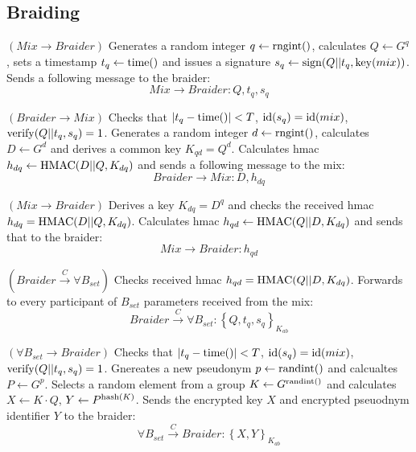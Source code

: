 \documentclass[12pt]{article}
\begin{document}
\subsection*{Braiding}

\begin{steps}
\item $(Mix \to Braider)$ Generates a random integer $q \leftarrow {\rm rngint}()$, calculates $Q \leftarrow G^q$, sets a timestamp $t_q \leftarrow {\rm time}()$ and issues a signature $s_q \leftarrow {\rm sign}(Q||t_q, {\rm key}(mix))$. Sends a following message to the braider:
  \begin{equation}
    Mix \to Braider: Q, t_q, s_q
  \end{equation}
\item $(Braider \to Mix)$ Checks that $|t_q - {\rm time}()|<T$, ${\rm id}(s_q)={\rm id}(mix)$, ${\rm verify}(Q||t_q, s_q) = 1$. Generates a random integer $d \leftarrow {\rm rngint}()$, calculates $D \leftarrow G^d$ and derives a common key $K_{qd} = Q^d$. Calculates hmac $h_{dq} \leftarrow {\rm HMAC}(D||Q,K_{dq})$ and sends a following message to the mix:
  \begin{equation}
    Braider \to Mix: D, h_{dq}
  \end{equation}
\item $(Mix \to Braider)$ Derives a key $K_{dq}=D^q$ and checks the received hmac $h_{dq} = {\rm HMAC}(D||Q,K_{dq})$. Calculates hmac $h_{qd} \leftarrow {\rm HMAC}(Q||D,K_{dq})$ and sends that to the braider:
  \begin{equation}
    Mix \to Braider: h_{qd}
  \end{equation}
\item $(Braider \overset{C}{\to} \forall B_{set})$ Checks received hmac $h_{qd} = {\rm HMAC}(Q||D,K_{dq})$. Forwards to every participant of $B_{set}$ parameters received from the mix:
  \begin{equation}
    Braider \overset{C}{\to} \forall B_{set}: \left\{ Q, t_q, s_q \right\}_{K_{ab}}
  \end{equation}
  
\item $(\forall B_{set} \to Braider)$ Checks that $|t_q - {\rm time}()|<T$, ${\rm id}(s_q)={\rm id}(mix)$, ${\rm verify}(Q||t_q, s_q) = 1$. Gnereates a new pseudonym $p \leftarrow {\rm randint}()$ and calcualtes $P \leftarrow G^p$. Selects a random element from a group $K \leftarrow G^{{\rm randint}()}$ and calculates $X \leftarrow K \cdot Q$, $Y \leftarrow P^{{\rm hash}(K)}$. Sends the encrypted key $X$ and encrypted pseuodnym identifier $Y$ to the braider:
  \begin{equation}
    \forall B_{set} \overset{C}{\to} Braider: \left\{ X , Y \right\}_{K_{ab}}
  \end{equation}
  

\end{steps}
\end{document}
